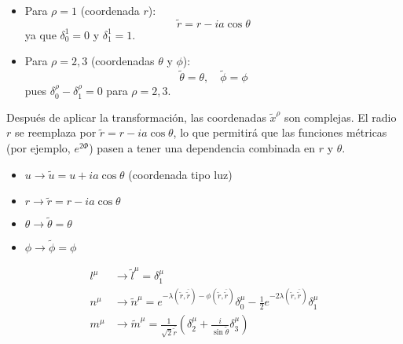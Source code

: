 \begin{enumerate}[1.]
\begin{itemize}
              \item Para $\rho = 1$ (coordenada $r$):
                    \begin{equation}
                        \tilde{r} = r - i a \cos \theta
                    \end{equation}
                    ya que $\delta_0^1 = 0$ y $\delta_1^1 = 1$.

              \item Para $\rho = 2, 3$ (coordenadas $\theta$ y $\phi$):
                    \begin{equation}
                        \tilde{\theta} = \theta, \quad \tilde{\phi} = \phi
                    \end{equation}
                    pues $\delta_0^\rho - \delta_1^\rho = 0$ para $\rho = 2, 3$.
          \end{itemize}

          Después de aplicar la transformación, las coordenadas $\tilde{x}^\rho$ son complejas. El radio $r$ se reemplaza por $\tilde{r} = r - i a \cos \theta$, lo que permitirá que las funciones métricas (por ejemplo, $e^{2 \Phi}$) pasen a tener una dependencia combinada en $r$ y $\theta$.

          \begin{itemize}
              \item $u \rightarrow \tilde{u} = u + ia \cos \theta$ (coordenada tipo luz)
              \item $r \rightarrow \tilde{r} = r - i a \cos \theta$
              \item $\theta \rightarrow \tilde{\theta} = \theta$
              \item $\phi \rightarrow \tilde{\phi} = \phi$
          \end{itemize}

          \begin{equation}
              \begin{aligned}
                  l^\mu & \rightarrow \tilde{l}^\mu = \delta_1^\mu                                                                                                                                                                  \\
                  n^\mu & \rightarrow \tilde{n}^\mu = e^{-\lambda(\tilde{r}, \overline{\tilde{r}}) - \phi(\tilde{r}, \overline{\tilde{r}})} \delta_0^\mu - \frac{1}{2} e^{-2 \lambda(\tilde{r}, \overline{\tilde{r}})} \delta_1^\mu \\
                  m^\mu & \rightarrow \tilde{m}^\mu = \frac{1}{\sqrt{2} \overline{\tilde{r}}} \left( \delta_2^\mu + \frac{i}{\sin \tilde{\theta}} \delta_3^\mu \right)
              \end{aligned}
          \end{equation}


\end{enumerate}
